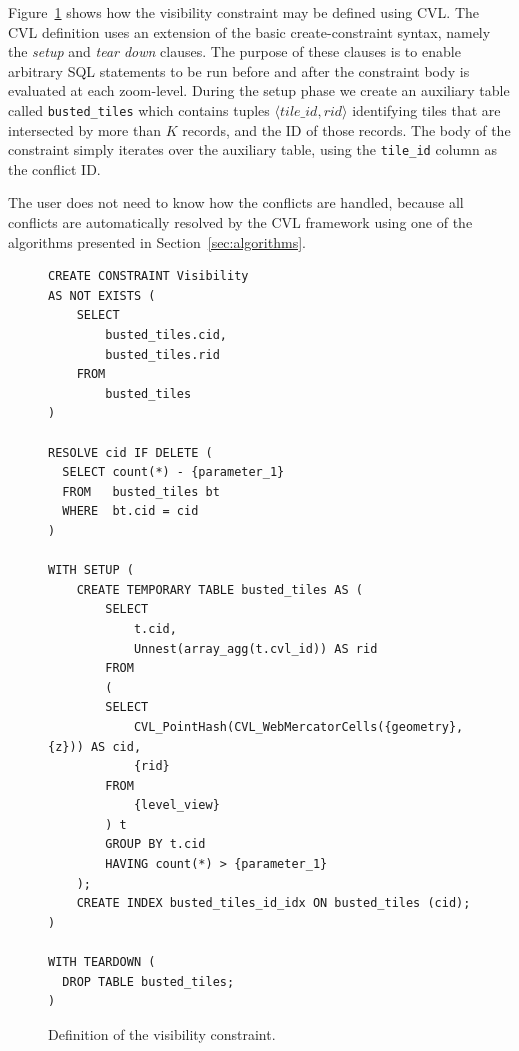 \vspace{5em}

Figure~\ref{fig:visibility:definition} shows how the visibility constraint may be defined using CVL. The CVL definition uses an extension of the basic create-constraint syntax, namely the \emph{setup} and \emph{tear down} clauses. 
The purpose of these clauses is to enable arbitrary SQL statements to be run before and after the constraint body is evaluated at each zoom-level. During the setup phase we create an auxiliary table called \texttt{busted\_tiles} which contains tuples $\langle tile\_id, rid \rangle$ identifying tiles that are intersected by more than $K$ records, and the ID of those records. The body of the constraint simply iterates over the auxiliary table, using the \texttt{tile\_id} column as the conflict ID.

The user does not need to know how the conflicts are handled, because all conflicts are automatically resolved by the CVL framework using one of the algorithms presented in Section~\ref{sec:algorithms}.


\begin{figure}[htbp]
\begin{center}
\begin{lstlisting}
CREATE CONSTRAINT Visibility
AS NOT EXISTS (
    SELECT
        busted_tiles.cid,
        busted_tiles.rid
    FROM
        busted_tiles
)

RESOLVE cid IF DELETE (
  SELECT count(*) - {parameter_1}
  FROM   busted_tiles bt
  WHERE  bt.cid = cid
)

WITH SETUP (
    CREATE TEMPORARY TABLE busted_tiles AS (
        SELECT
            t.cid,
            Unnest(array_agg(t.cvl_id)) AS rid
        FROM
        (
        SELECT
            CVL_PointHash(CVL_WebMercatorCells({geometry}, {z})) AS cid,
            {rid}
        FROM
            {level_view}
        ) t
        GROUP BY t.cid
        HAVING count(*) > {parameter_1}
    );
    CREATE INDEX busted_tiles_id_idx ON busted_tiles (cid);
)

WITH TEARDOWN (
  DROP TABLE busted_tiles;
)
\end{lstlisting}
\caption{Definition of the visibility constraint.}
\label{fig:visibility:definition}
\end{center}
\end{figure}


